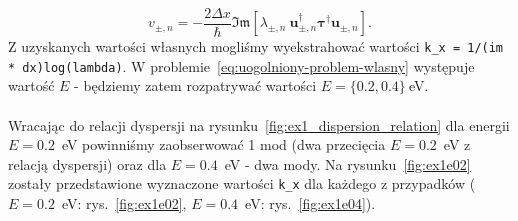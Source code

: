 \documentclass{article}
\begin{document}
\begin{equation}
    v_{\pm, n} = -\frac{2\Delta x}{\hbar}\mathfrak{Im}\left[\lambda_{\pm, n} \ \mathbf{u}^{\dagger}_{\pm, n}\boldsymbol{\tau}^{\dagger}\mathbf{u}_{\pm, n}\right].
\end{equation}
Z uzyskanych wartości własnych mogliśmy wyekstrahować wartości \texttt{k\_x = 1/(im * dx)log(lambda)}. 
W problemie~\eqref{eq:uogolniony-problem-wlasny} występuje wartość $E$ - będziemy zatem rozpatrywać wartości $E = \{0.2, 0.4\}~$eV.\\
\\
Wracając do relacji dyspersji na rysunku~\ref{fig:ex1_dispersion_relation} dla energii $E = 0.2$~eV powinniśmy zaobserwować 1 mod (dwa przecięcia $E = 0.2$~eV z relacją dyspersji) oraz dla $E = 0.4$~eV - dwa mody.
Na rysunku~\ref{fig:ex1e02} zostały przedstawione wyznaczone wartości \texttt{k\_x} dla każdego z przypadków ($E = 0.2$~eV: rys.~\ref{fig:ex1e02}, $E = 0.4$~eV: rys.~\ref{fig:ex1e04}).\\
\end{document}
